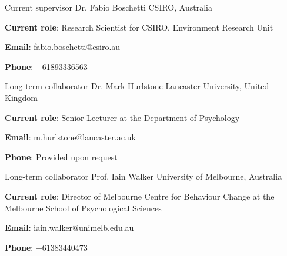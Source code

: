 

\begin{cventries}

  \cventry
    {Current supervisor} %
    {Dr. Fabio Boschetti} %
    {CSIRO,}%
    {Australia} %
    {
      \begin{cvitems} %
        \item {\textbf{Current role}: Research Scientist for CSIRO, Environment Research Unit}
        \item {\textbf{Email}: fabio.boschetti@csiro.au}
        \item {\textbf{Phone}: +61893336563}
      \end{cvitems}
    }

  \cventry
    {Long-term collaborator} %
    {Dr. Mark Hurlstone} %
    {Lancaster University,}%
    {United Kingdom} %
    {
      \begin{cvitems} %
        \item {\textbf{Current role}: Senior Lecturer at the Department of Psychology}
        \item {\textbf{Email}: m.hurlstone@lancaster.ac.uk}
        \item {\textbf{Phone}: Provided upon request}
      \end{cvitems}
    }

  \cventry
    {Long-term collaborator} %
    {Prof. Iain Walker} %
    {University of Melbourne,} %
    {Australia} %
    {
      \begin{cvitems} %
        \item {\textbf{Current role}:  Director of Melbourne Centre for Behaviour Change at the Melbourne School of Psychological Sciences}
        \item {\textbf{Email}: iain.walker@unimelb.edu.au}
        \item {\textbf{Phone}: +61383440473}
      \end{cvitems}
    }
    

\end{cventries}


